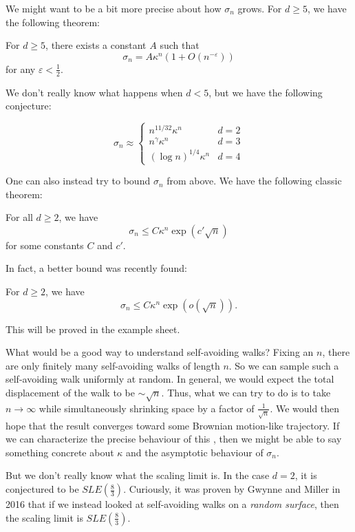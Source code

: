 \documentclass[a4paper]{article}
\begin{document}
We might want to be a bit more precise about how $\sigma_n$ grows. For $d \geq 5$, we have the following theorem:
\begin{thm}
  For $d \geq 5$, there exists a constant $A$ such that
  \[
    \sigma_n = A \kappa^n (1 + O(n^{-\varepsilon}))
  \]
  for any $\varepsilon < \frac{1}{2}$.
\end{thm}

We don't really know what happens when $d < 5$, but we have the following conjecture:

\begin{conjecture}
  \[
    \sigma_n \approx
    \begin{cases}
      n^{11/32} \kappa^n & d = 2\\
      n^\gamma \kappa^n & d = 3\\
      (\log n)^{1/4} \kappa^n & d = 4
    \end{cases}
  \]
\end{conjecture}

One can also instead try to bound $\sigma_n$ from above. We have the following classic theorem:
\begin{thm}
  For all $d \geq 2$, we have
  \[
    \sigma_n \leq C \kappa^n \exp(c' \sqrt{n})
  \]
  for some constants $C$ and $c'$.
\end{thm}

In fact, a better bound was recently found:
\begin{thm}[Hutchcroft, 2017]
  For $d \geq 2$, we have
  \[
     \sigma_n \leq C \kappa^n \exp(o(\sqrt{n})).
  \]
\end{thm}
This will be proved in the example sheet.

What would be a good way to understand self-avoiding walks? Fixing an $n$, there are only finitely many self-avoiding walks of length $n$. So we can sample such a self-avoiding walk uniformly at random. In general, we would expect the total displacement of the walk to be $\sim \sqrt{n}$. Thus, what we can try to do is to take $n \to \infty$ while simultaneously shrinking space by a factor of $\frac{1}{\sqrt{n}}$. We would then hope that the result converges toward some Brownian motion-like trajectory. If we can characterize the precise behaviour of this , then we might be able to say something concrete about $\kappa$ and the asymptotic behaviour of $\sigma_n$.

But we don't really know what the scaling limit is. In the case $d = 2$, it is conjectured to be $SLE(\frac{8}{3})$. Curiously, it was proven by Gwynne and Miller in 2016 that if we instead looked at self-avoiding walks on a \emph{random surface}, then the scaling limit is $SLE(\frac{8}{3})$.
\end{document}
